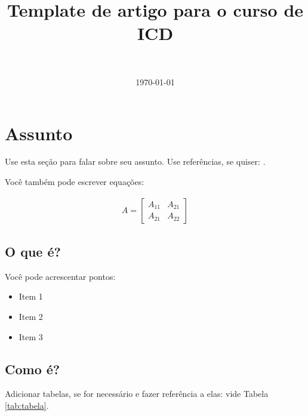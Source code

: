 \documentclass[10pt, a4paper, twocolumn]{article}
\title{Template de artigo para o curso de ICD} %
\author{
	\authorstyle{Augustus Norius\textsuperscript{1,2}} \\ %
}
\date{\today}
\begin{document}
\maketitle %
\thispagestyle{firstpage} 





\section*{Assunto}

Use esta seção para falar sobre seu assunto. Use referências, se quiser: \citep{ref1} \citep{ref2}. 

Você também pode escrever equações:

\lipsum[1-2]

\begin{align}
	A = 
	\begin{bmatrix}
		A_{11} & A_{21} \\
		A_{21} & A_{22}
	\end{bmatrix}
\end{align}

\lipsum[1]

\subsection*{O que é?}

Você pode acrescentar pontos:

\begin{itemize}
	\item Item 1
	\item Item 2
	\item Item 3
\end{itemize}

\subsection*{Como é?}

Adicionar tabelas, se for necessário e fazer referência a elas: vide Tabela \ref{tab:tabela}.
\end{document}
